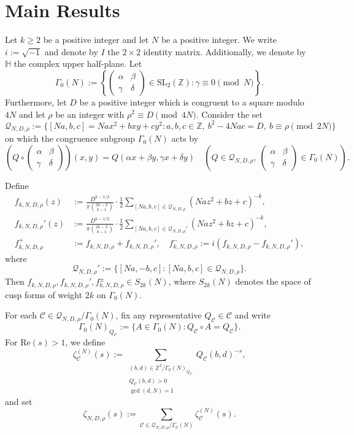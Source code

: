 \documentclass[12pt]{amsart}
\numberwithin{equation}{section}
\theoremstyle{definition}
\begin{document}
\section{Main Results}\label{sec-mainresults}


Let $k\geq 2$ be a positive integer and let $N$ be a positive integer. 
We write $i:=\sqrt{-1}$ and denote by $I$ the $2\times 2$ identity matrix. Additionally, we denote by $\mathbb{H}$ the complex upper half-plane.
Let
$$\Gamma_{0}(N):=\left\{\left(\begin{smallmatrix}
    \alpha & \beta \\ \gamma & \delta
\end{smallmatrix}\right)\in\mathrm{SL}_{2}(\mathbb{Z}):\gamma\equiv 0\pmod{N}\right\}.$$
Furthermore, let $D$ be a positive integer which is congruent to a square modulo $4N$ and let $\rho$ be an integer with $\rho^{2}\equiv D\pmod{4N}$. Consider the set
$$\mathcal{Q}_{N,D,\rho}:=\{[Na,b,c]=Nax^{2}+bxy+cy^{2}:a,b,c\in\mathbb{Z},~b^{2}-4Nac=D,~b\equiv\rho\pmod{2N}\}$$
on which the congruence subgroup $\Gamma_{0}(N)$ acts by
$$\left(Q\circ\left(\begin{smallmatrix}
    \alpha & \beta \\ \gamma & \delta
\end{smallmatrix}\right)\right)(x,y)=Q(\alpha x+\beta y,\gamma x+\delta y)\quad\left(Q\in\mathcal{Q}_{N,D,\rho},~\left(\begin{smallmatrix}
    \alpha & \beta \\ \gamma & \delta
\end{smallmatrix}\right)\in\Gamma_{0}(N)\right).$$

Define
\begin{align*}
    f_{k,N,D,\rho}(z)&:=\frac{D^{k-1/2}}{\pi\binom{2k-2}{k-1}}\cdot\frac{1}{2}\sum_{[Na,b,c]\in\mathcal{Q}_{N,D,\rho}}(Naz^{2}+bz+c)^{-k},\\
    f_{k,N,D,\rho}'(z)&:=\frac{D^{k-1/2}}{\pi\binom{2k-2}{k-1}}\cdot\frac{1}{2}\sum_{[Na,b,c]\in\mathcal{Q}_{N,D,\rho}'}(Naz^{2}+bz+c)^{-k},\\
    f_{k,N,D,\rho}^{+}&:=f_{k,N,D,\rho}+f_{k,N,D,\rho}',\quad f_{k,N,D,\rho}^{-}:=i(f_{k,N,D,\rho}-f_{k,N,D,\rho}'),
\end{align*}
where
$$\mathcal{Q}_{N,D,\rho}':=\{[Na,-b,c]:[Na,b,c]\in\mathcal{Q}_{N,D,\rho}\}.$$
Then $f_{k,N,D,\rho}, f_{k,N,D,\rho}', f_{k,N,D,\rho}^{\pm}\in S_{2k}(N)$, where $S_{2k}(N)$ denotes the space of cusp forms of weight $2k$ on $\Gamma_{0}(N)$.

For each $\mathcal{C}\in\mathcal{Q}_{N,D,\rho}/\Gamma_{0}(N)$, fix any representative $Q_{\mathcal{C}}\in\mathcal{C}$ and write
$$\Gamma_{0}(N)_{Q_{\mathcal{C}}}:=\{A\in\Gamma_{0}(N):Q_{\mathcal{C}}\circ A=Q_{\mathcal{C}}\}.$$
For $\mathrm{Re}(s)>1$, we define
$$\zeta_{\mathcal{C}}^{(N)}(s):=\sum\limits_{\substack{(b,d)\in\mathbb{Z}^{2}/\Gamma_{0}(N)_{Q_{\mathcal{C}}} \\ Q_{\mathcal{C}}(b,d)>0 \\ \gcd(d,N)=1}}Q_{\mathcal{C}}(b,d)^{-s},$$
and set
$$\zeta_{N,D,\rho}(s):=\sum_{\mathcal{C}\in\mathcal{Q}_{N,D,\rho}/\Gamma_{0}(N)}\zeta_{\mathcal{C}}^{(N)}(s).$$
\end{document}
